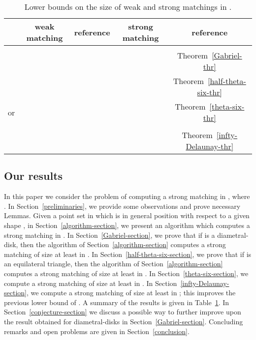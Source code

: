 \documentclass[11pt,a4paper]{article}
\begin{document}
\begin{table}
\centering
\begin{minipage}{13cm}\centering
\caption{Lower bounds on the size of weak and strong matchings in .}
\label{table1}
    \begin{tabular}{|c|c|c||c|c|}
         \hline
              	& weak matching & reference& strong matching &reference \\  \hline  \hline
	      {}& 	&\cite{Dillencourt1990}& &\cite{Abrego2004}\\
	      {} &&\cite{Biniaz2014} &&Theorem~\ref{Gabriel-thr}\\  
             {} &&\cite{Babu2014} &&Theorem~\ref{half-theta-six-thr}\\  
	    { or } && \cite{Babu2014} &&Theorem~\ref{theta-six-thr}\\ \hline\hline
	    \multirow{2}{*}{}& \multirow{2}{*}{} &\multirow{2}{*}{\cite{Abrego2004, Abrego2009}}&
	     & \cite{Abrego2004, Abrego2009}       \\ 
		& &	& & Theorem~\ref{infty-Delaunay-thr} \\ \hline
    \end{tabular}
    \end{minipage}
\end{table}

\subsection{Our results}
\label{our-results}
In this paper we consider the problem of computing a strong matching in , where . In Section~\ref{preliminaries}, we provide some observations and prove necessary Lemmas. Given a point set  in which is in general position with respect to a given shape , in Section~\ref{algorithm-section}, we present an algorithm which computes a strong matching in . In Section~\ref{Gabriel-section}, we prove that if  is a diametral-disk, then the algorithm of Section~\ref{algorithm-section} computes a strong matching of size at least  in . In Section~\ref{half-theta-six-section}, we prove that if  is an equilateral triangle, then the algorithm of Section~\ref{algorithm-section} computes a strong matching of size at least  in . In Section~\ref{theta-six-section}, we compute a strong matching of size at least  in . In Section~\ref{infty-Delaunay-section}, we compute a strong matching of size at least  in ; this improves the previous lower bound of . A summary of the results is given in Table~\ref{table1}. In Section~\ref{conjecture-section} we discuss a possible way to further improve upon the result obtained for diametral-disks in Section~\ref{Gabriel-section}. Concluding remarks and open problems are given in Section~\ref{conclusion}.
\end{document}
